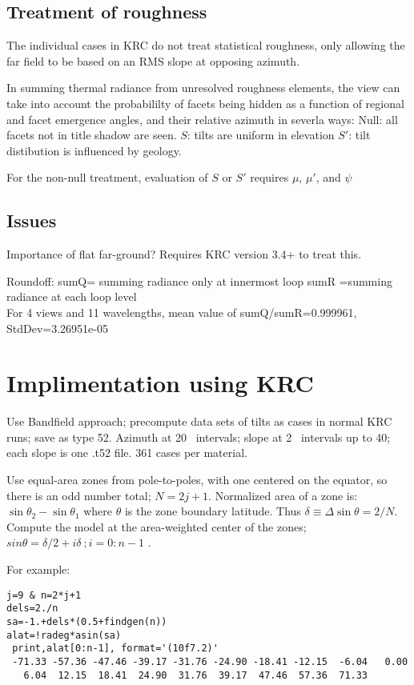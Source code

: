 \documentclass{article}
\begin{document}
\subsection{Treatment of roughness}  %

The individual cases in KRC do not treat statistical roughness, only allowing
the far field to be based on an RMS slope at opposing azimuth.

In summing thermal radiance from unresolved roughness elements, the view can
take into account the probabililty of facets being hidden as a function of
regional and facet emergence angles, and their relative azimuth in severla ways:
\qi Null: all facets not in title shadow are seen. 
\qi $S$: tilts are uniform in elevation 
\qi $S'$: tilt distibution is influenced by geology.

For the non-null treatment, evaluation of $S$ or $S'$ requires $\mu$, $\mu'$,
and $\psi$

\subsection{Issues}  %
Importance of  flat far-ground? Requires KRC version 3.4+ to treat this.

 Roundoff:
\qi sumQ= summing radiance only at innermost loop 
\qi sumR =summing radiance at each loop level
\\ For 4 views and 11 wavelengths, mean value of sumQ/sumR=0.999961, StdDev=3.26951e-05

\section{Implimentation using KRC}
Use Bandfield approach; precompute data sets of tilts as cases in
normal KRC runs; save as type 52. Azimuth at 20\qd~ intervals; slope at 2\qd~
intervals up to 40\qd; each slope is one .t52 file. 361 cases per material.

Use equal-area zones from pole-to-poles, with one centered on the equator, so
there is an odd number total; $N=2j+1$.  Normalized area of a zone is: $\sin
\theta_2 - \sin \theta_1$ where $\theta$ is the zone boundary latitude. Thus
$\delta \equiv \Delta \sin \theta = 2/N $.  Compute the model at the
area-weighted center of the zones; $sin \theta= \delta/2+i \delta \ ; i=0:n-1$ .

 For example:
\begin{verbatim}
j=9 & n=2*j+1
dels=2./n
sa=-1.+dels*(0.5+findgen(n))
alat=!radeg*asin(sa)
 print,alat[0:n-1], format='(10f7.2)'
 -71.33 -57.36 -47.46 -39.17 -31.76 -24.90 -18.41 -12.15  -6.04   0.00
   6.04  12.15  18.41  24.90  31.76  39.17  47.46  57.36  71.33  
\end{verbatim}
\end{document}
